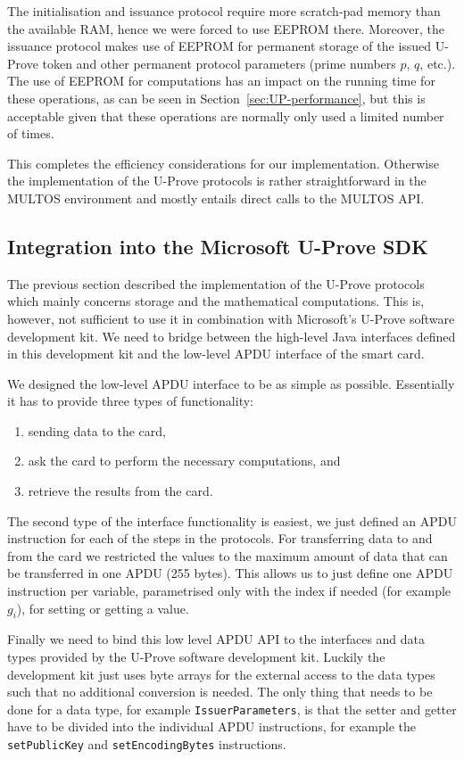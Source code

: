 The initialisation and issuance protocol require more scratch-pad memory than
the available RAM, hence we were forced to use EEPROM there. Moreover, the
issuance protocol makes use of EEPROM for permanent storage of the issued
U-Prove token and other permanent protocol parameters (prime numbers $p$, $q$,
etc.). The use of EEPROM for computations has an impact on the running time for
these operations, as can be seen in Section~\ref{sec:UP-performance}, but this
is acceptable given that these operations are normally only used a limited
number of times.

This completes the efficiency considerations for our implementation. Otherwise
the implementation of the U-Prove protocols is rather straightforward in the
MULTOS environment and mostly entails direct calls to the MULTOS API.

\subsection{Integration into the Microsoft U-Prove SDK}

The previous section described the implementation of the U-Prove protocols which
mainly concerns storage and the mathematical computations. This is, however, not
sufficient to use it in combination with Microsoft's U-Prove software
development kit. We need to bridge between the high-level Java interfaces
defined in this development kit and the low-level APDU interface of the smart
card.

We designed the low-level APDU interface to be as simple as possible.
Essentially it has to provide three types of functionality:
\begin{enumerate}
  \item sending data to the card,
  \item ask the card to perform the necessary computations, and
  \item retrieve the results from the card.
\end{enumerate}
The second type of the interface functionality is easiest, we just defined an
APDU instruction for each of the steps in the protocols. For transferring data
to and from the card we restricted the values to the maximum amount of data that
can be transferred in one APDU (255 bytes). This allows us to just define one
APDU instruction per variable, parametrised only with the index if needed (for
example $g_i$), for setting or getting a value.

Finally we need to bind this low level APDU API to the interfaces and data types
provided by the U-Prove software development kit. Luckily the development kit
just uses byte arrays for the external access to the data types such that no
additional conversion is needed. The only thing that needs to be done for a data
type, for example \lstinline{IssuerParameters}, is that the setter and getter
have to be divided into the individual APDU instructions, for example the
\lstinline{setPublicKey} and \lstinline{setEncodingBytes} instructions.

